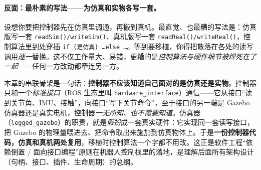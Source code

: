 \paragraph{反面：最朴素的写法——为仿真和实物各写一套。}
设想你要把控制器先在仿真里调通，再搬到真机。最直觉、也最糟的写法是：仿真版写一套 \texttt{readSim()/writeSim()}、真机版写一套 \texttt{readReal()/writeReal()}，控制算法里到处穿插 \texttt{if (是仿真) \dots else \dots}。等到要移植，你得把散落在各处的读写调用\emph{逐一}替换\cite{unitree2023quadruped}。这不仅工作量大、易错，更糟的是\emph{控制算法与硬件细节被焊死在了一起}——任何一方改动都牵连另一方。

\begin{insight}\label{ins:qp-abstraction}
本章的串联骨架是一句话：\textbf{控制器不应该知道自己面对的是仿真还是实物}。控制器只和一个\emph{标准接口}（ROS 生态里叫 \texttt{hardware\_interface}）通信——它从接口“读到关节角、IMU、接触”，向接口“写下关节命令”，至于接口的另一端是 Gazebo 仿真器还是真实电机，控制器\emph{一无所知、也不需要知道}。仿真器（\texttt{legged\_gazebo}）的职责，就是\emph{假扮}成一套真实硬件：它实现同一套读写接口，把 Gazebo 的物理量喂进去、把命令取出来施加到仿真物体上。于是\textbf{一份控制器代码，仿真和真机两处复用}，移植时控制算法一个字都不用改\cite{unitree2023quadruped}。这正是软件工程“依赖倒置 / 面向接口编程”原则在机器人控制栈里的落地，是理解后面所有架构设计（句柄、接口、插件、生命周期）的总纲。
\end{insight}


